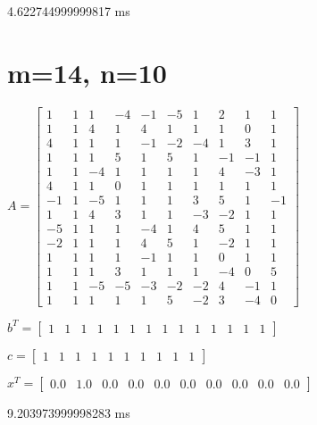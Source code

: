 \documentclass[8pt]{article}
\begin{document}
4.622744999999817  ms


\section{ m=14, n=10 }



$ A =
\begin{bmatrix}
  1  &  1  &  1  & -4  & -1  & -5  &  1  &  2  &  1  &  1 \\
  1  &  1  &  4  &  1  &  4  &  1  &  1  &  1  &  0  &  1 \\
  4  &  1  &  1  &  1  & -1  & -2  & -4  &  1  &  3  &  1 \\
  1  &  1  &  1  &  5  &  1  &  5  &  1  & -1  & -1  &  1 \\
  1  &  1  & -4  &  1  &  1  &  1  &  1  &  4  & -3  &  1 \\
  4  &  1  &  1  &  0  &  1  &  1  &  1  &  1  &  1  &  1 \\
 -1  &  1  & -5  &  1  &  1  &  1  &  3  &  5  &  1  & -1 \\
  1  &  1  &  4  &  3  &  1  &  1  & -3  & -2  &  1  &  1 \\
 -5  &  1  &  1  &  1  & -4  &  1  &  4  &  5  &  1  &  1 \\
 -2  &  1  &  1  &  1  &  4  &  5  &  1  & -2  &  1  &  1 \\
  1  &  1  &  1  &  1  & -1  &  1  &  1  &  0  &  1  &  1 \\
  1  &  1  &  1  &  3  &  1  &  1  &  1  & -4  &  0  &  5 \\
  1  &  1  & -5  & -5  & -3  & -2  & -2  &  4  & -1  &  1 \\
  1  &  1  &  1  &  1  &  1  &  5  & -2  &  3  & -4  &  0 
\end{bmatrix}
$


$ b^T =
\begin{bmatrix}
  1  &  1  &  1  &  1  &  1  &  1  &  1  &  1  &  1  &  1  &  1  &  1  &  1  &  1 
\end{bmatrix}
$


$ c =
\begin{bmatrix}
  1  &  1  &  1  &  1  &  1  &  1  &  1  &  1  &  1  &  1 
\end{bmatrix}
$


$ x^T =
\begin{bmatrix}
  0.0 &  1.0 &  0.0 &  0.0 &  0.0 &  0.0 &  0.0 &  0.0 &  0.0 &  0.0
\end{bmatrix}
$


9.203973999998283  ms
\end{document}
